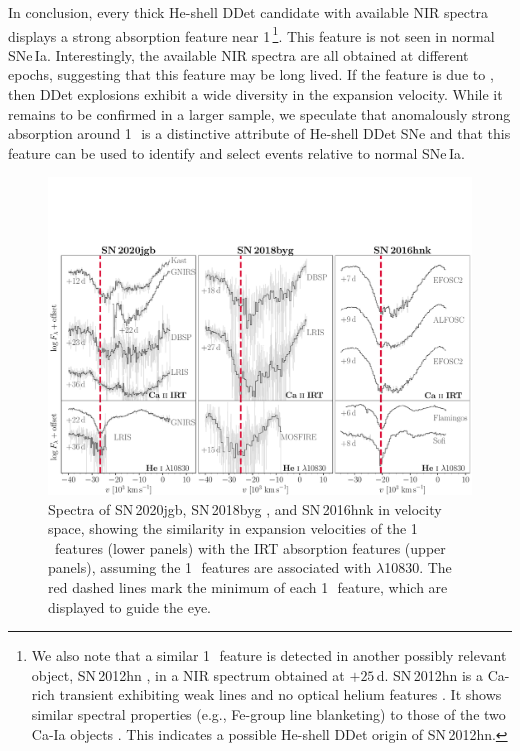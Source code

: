 \documentclass[twocolumn]{aastex631}
\newcommand{\sn}{SN\,2020jgb}
\begin{document}
\begin{CJK*}{UTF8}{gbsn}
In conclusion, every thick He-shell DDet candidate with available NIR spectra displays a strong absorption feature near 1\,\micron\footnote{We also note that a similar 1\,\micron\ feature is detected in another possibly relevant object, SN\,2012hn \citep{Valenti_12hn_2014}, in a NIR spectrum obtained at $+25$\,d. SN\,2012hn is a Ca-rich transient exhibiting weak  lines and no optical helium features \citep[thus termed as a Ca-Ic object by][]{De_Ca-rich_2020}. It shows similar spectral properties (e.g., Fe-group line blanketing) to those of the two Ca-Ia objects \citep{De_Ca-rich_2020}. This indicates a possible He-shell DDet origin of SN\,2012hn.}. 
This feature is not seen in normal SNe\,Ia. Interestingly, the available NIR spectra are all obtained at different epochs, suggesting that this feature may be long lived. If the feature is due to , then DDet explosions exhibit a wide diversity in the expansion velocity. While it remains to be confirmed in a larger sample, we speculate that anomalously strong absorption around 1\,\micron\ is a distinctive attribute of He-shell DDet SNe and that this feature can be used to identify and select events relative to normal SNe\,Ia.

\begin{figure}
    \centering
    \includegraphics[width=\textwidth]{CaII_HeI_hvf.pdf}
    \caption{Spectra of \sn, SN\,2018byg \citep{de_18byg_2019}, and SN\,2016hnk \citep{galbany_16hnk_2019} in velocity space, showing the similarity in expansion velocities of the 1\,\micron\ features (lower panels) with the  IRT absorption features (upper panels), assuming the 1\,\micron\ features are associated with  $\lambda$10830. The red dashed lines mark the minimum of each 1\,\micron\ feature, which are displayed to guide the eye.}
    \label{fig:hvf_comp}
\end{figure}


\end{CJK*}
\end{document}
